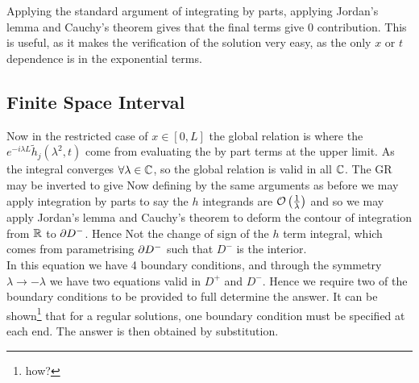 \documentclass{article}
\begin{document}
Applying the standard argument of integrating by parts, applying Jordan's lemma and Cauchy's theorem gives that the final terms give 0 contribution. This is useful, as it makes the verification of the solution very easy, as the only $x$ or $t$ dependence is in the exponential terms. 
\subsection{Finite Space Interval}
Now in the restricted case of $x \in [0,L]$ the global relation is 
where the $e^{-i\lambda L} \tilde{h}_j(\lambda^2,t)$ come from evaluating the by part terms at the upper limit.  As 
the integral converges $\forall \lambda \in \mathbb{C}$, so the global relation is valid in all $\mathbb{C}$. The GR may be inverted to give 
Now defining 
by the same arguments as before we may apply integration by parts to say the $h$ integrands are $\mathcal{O}\left( \frac{1}{\lambda} \right)$ and so we may apply Jordan's lemma and Cauchy's theorem to deform the contour of integration from $\mathbb{R}$ to $\partial D^-$. Hence 
Not the change of sign of the $h$ term integral, which comes from parametrising $\partial D^-$ such that $D^-$ is the interior. \\
In this equation we have 4 boundary conditions, and through the symmetry $\lambda \to -\lambda$ we have two equations valid in $D^+$ and $D^-$. Hence we require two of the boundary conditions to be provided to full determine the answer. It can be shown\footnote{how?} that for a regular solutions, one boundary condition must be specified at each end. The answer is then obtained by substitution.  
\end{document}
